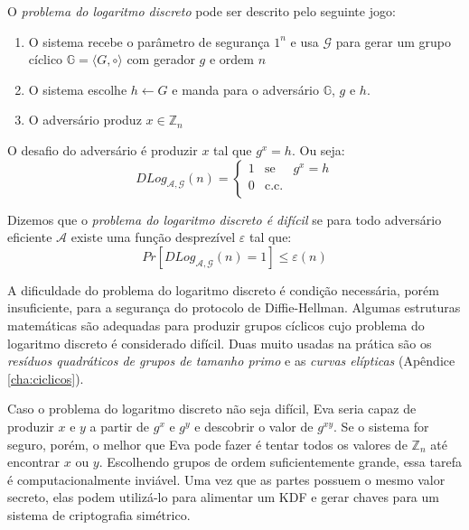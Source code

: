 O {\em problema do logaritmo discreto} pode ser descrito pelo seguinte jogo:
\begin{enumerate}
\item O sistema recebe o parâmetro de segurança $1^n$ e usa $\mathcal{G}$ para gerar um grupo cíclico $\mathbb{G} = \langle G, \circ \rangle$ com gerador $g$ e ordem $n$
\item O sistema escolhe $h \leftarrow G$ e manda para o adversário $\mathbb{G}$, $g$ e $h$.
\item O adversário produz $x \in \mathbb{Z}_n$
\end{enumerate}

O desafio do adversário é produzir $x$ tal que $g^x = h$.
Ou seja:
\begin{displaymath}
  DLog_{\mathcal{A}, \mathcal{G}}(n) = \left\{
    \begin{array}{lcl}
      1 & \textrm{se} & g^x = h\\
      0 & \textrm{c.c.} &\\
    \end{array}
    \right.
\end{displaymath}

Dizemos que o {\em problema do logaritmo discreto é difícil} se para todo adversário eficiente $\mathcal{A}$ existe uma função desprezível $\varepsilon$ tal que:
\begin{displaymath}
  Pr[DLog_{\mathcal{A}, \mathcal{G}}(n) = 1] \leq \varepsilon(n)
\end{displaymath}

A dificuldade do problema do logaritmo discreto é condição necessária, porém insuficiente, para a segurança do protocolo de Diffie-Hellman.
Algumas estruturas matemáticas são adequadas para produzir grupos cíclicos cujo problema do logaritmo discreto é considerado difícil.
Duas muito usadas na prática são os {\em resíduos quadráticos de grupos de tamanho primo} e as {\em curvas elípticas} (Apêndice \ref{cha:ciclicos}).

Caso o problema do logaritmo discreto não seja difícil, Eva seria capaz de produzir $x$ e $y$ a partir de $g^x$ e $g^y$ e descobrir o valor de $g^{xy}$.
Se o sistema for seguro, porém, o melhor que Eva pode fazer é tentar todos os valores de $\mathbb{Z}_n$ até encontrar $x$ ou $y$.
Escolhendo grupos de ordem suficientemente grande, essa tarefa é computacionalmente inviável.
Uma vez que as partes possuem o mesmo valor secreto, elas podem utilizá-lo para alimentar um KDF e gerar chaves para um sistema de criptografia simétrico.

